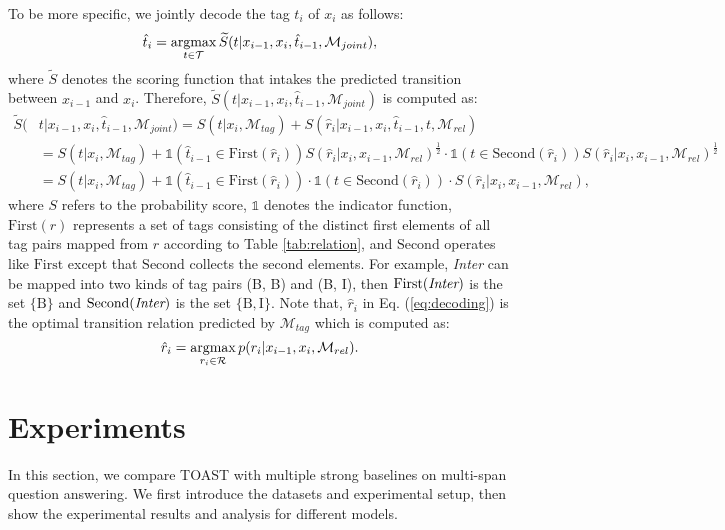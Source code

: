 \documentclass[a4paper]{cas-sc}
\newcommand{\1}[1]{\mathds{1}\left[#1\right]}
\newcommand{\eqnref}[1]{Eq. (\ref{#1})}
\newcommand{\tableref}[1]{Table \ref{#1}}
\newcommand{\argmax}{\operatornamewithlimits{argmax}}
\begin{document}
To be more specific, we jointly decode the tag $t_i$ of $x_i$ as  follows:
\begin{equation}\label{eq:t_i}
	\hat{t}_i = \argmax_{t\in \mathcal{T}} \widetilde{S}(t | x_{i-1}, x_i, \hat{t}_{i-1}, \mathcal{M}_{joint}),
\end{equation}
where $\widetilde{S}$ denotes the scoring function that intakes the predicted transition between $x_{i-1}$ and $x_i$.
Therefore, $\widetilde{S}(t  | x_{i-1}, x_i, \hat{t}_{i-1}, \mathcal{M}_{joint})$ is computed as: 
\begin{equation}\label{eq:decoding}
	\begin{split}
		\widetilde{S}(& t | x_{i-1}, x_i, \hat{t}_{i-1},  \mathcal{M}_{joint})  = S(t|x_i, \mathcal{M}_{tag}) +  S(\hat{r}_i | x_{i-1}, x_i, \hat{t}_{i-1}, t, \mathcal{M}_{rel})\\
		& = S(t|x_i, \mathcal{M}_{tag}) + \mathds{1}(\hat{t}_{i-1} \in \text{First}(\hat{r}_i)) S({\hat{r}_i}| x_i, x_{i-1}, \mathcal{M}_{rel})^{\frac{1}{2}}\cdot \mathds{1}(t \in \text{Second}(\hat{r}_i)) S({\hat{r}_i}| x_i, x_{i-1}, \mathcal{M}_{rel})^{\frac{1}{2}}\\
		& = S(t|x_i, \mathcal{M}_{tag}) + \mathds{1}(\hat{t}_{i-1} \in \text{First}(\hat{r}_i)) \cdot \mathds{1}(t \in \text{Second}(\hat{r}_i)) \cdot  S({\hat{r}_i}| x_i, x_{i-1}, \mathcal{M}_{rel}),
	\end{split}
\end{equation}
where $S$ refers to the probability score, $\mathds{1}$ denotes the indicator function, $\text{First}(r)$ represents 
a set of tags consisting of the distinct first elements of all tag pairs mapped from $r$ according to \tableref{tab:relation}, and $\text{Second}$ operates like $\text{First}$ except that $\text{Second}$ collects the second elements. 
For example, \emph{Inter} can be mapped into two kinds of tag pairs (B, B) and (B, I), then 
$\text{First}(\emph{\text{Inter}})$ is the set $\{\text{B}\}$ and   $\text{Second}(\emph{\text{Inter}})$ is the set $\{\text{B}, \text{I}\}$.
Note that, $\hat{r}_i$ in \eqnref{eq:decoding} is the optimal transition relation predicted by $\mathcal{M}_{tag}$ which is computed as: 
\begin{equation}\label{eq:r_i}
	\hat{r}_i = \argmax_{r_i\in \mathcal{R}} p(r_i | x_{i-1}, x_i, \mathcal{M}_{rel}).
\end{equation}

%	
\section{Experiments}
\label{sec:experiments} %
In this section, we compare TOAST with multiple strong baselines on multi-span question answering. 
We first introduce the datasets and experimental setup, 
then show the experimental results and analysis for different models.
\end{document}
